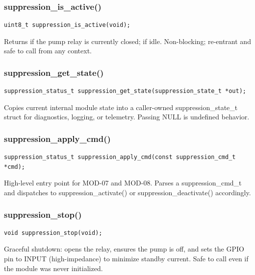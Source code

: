 \documentclass[12pt,a4paper]{article}
\newcommand{\fn}[1]{{\footnotesize\ttfamily #1}}
\begin{document}
\subsubsection{\fn{suppression\_is\_active()}}

\begin{lstlisting}[caption={Signature}]
uint8_t suppression_is_active(void);
\end{lstlisting}

Returns \fn{1} if the pump relay is currently closed; \fn{0} if idle. Non-blocking;
re-entrant and safe to call from any context.

\subsubsection{\fn{suppression\_get\_state()}}

\begin{lstlisting}[caption={Signature}]
suppression_status_t suppression_get_state(suppression_state_t *out);
\end{lstlisting}

Copies current internal module state into a caller-owned \fn{suppression\_state\_t}
struct for diagnostics, logging, or telemetry. Passing \fn{NULL} is undefined behavior.

\subsubsection{\fn{suppression\_apply\_cmd()}}

\begin{lstlisting}[caption={Signature}]
suppression_status_t suppression_apply_cmd(const suppression_cmd_t *cmd);
\end{lstlisting}

High-level entry point for MOD-07 and MOD-08. Parses a \fn{suppression\_cmd\_t}
and dispatches to \fn{suppression\_activate()} or \fn{suppression\_deactivate()}
accordingly.

\subsubsection{\fn{suppression\_stop()}}

\begin{lstlisting}[caption={Signature}]
void suppression_stop(void);
\end{lstlisting}

Graceful shutdown: opens the relay, ensures the pump is off, and sets the GPIO pin to
INPUT (high-impedance) to minimize standby current. Safe to call even if the module
was never initialized.
\end{document}
